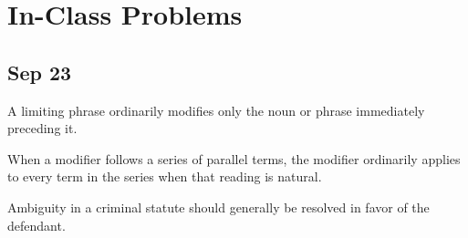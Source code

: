 \documentclass[11pt]{tex/lawoutline}
\begin{document}
\maketitle
\tableofcontents

\chapter{In-Class Problems}

\section{Sep 23}

{A limiting phrase ordinarily modifies only the noun or phrase immediately preceding it.}

{When a modifier follows a series of parallel terms, the modifier ordinarily applies to every term in the series when that reading is natural.}

{Ambiguity in a criminal statute should generally be resolved in favor of the defendant.}
\end{document}
